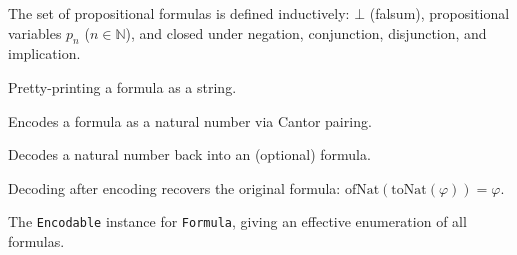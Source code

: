 %
\begin{definition}\label{def:formula}
  \leanok
  The set of propositional formulas is defined inductively:
  $\bot$ (falsum), propositional variables $p_n$ ($n \in \mathbb{N}$), and closed
  under negation, conjunction, disjunction, and implication.
\end{definition}
\begin{definition}\label{def:formula_tostr}
  \leanok
  Pretty-printing a formula as a string.
\end{definition}
\begin{definition}\label{def:formula_tonat}
  \leanok
  Encodes a formula as a natural number via Cantor pairing.
\end{definition}
\begin{definition}\label{def:formula_ofnat}
  \leanok
  Decodes a natural number back into an (optional) formula.
\end{definition}

\begin{theorem}\label{thm:formula_ofnat_tonat}
  \leanok
  Decoding after encoding recovers the original formula:
  $\mathrm{ofNat}(\mathrm{toNat}(\varphi)) = \varphi$.
\end{theorem}

\begin{definition}\label{def:formula_encodable}
  \leanok
  The \texttt{Encodable} instance for \texttt{Formula}, giving an effective
  enumeration of all formulas.
\end{definition}

